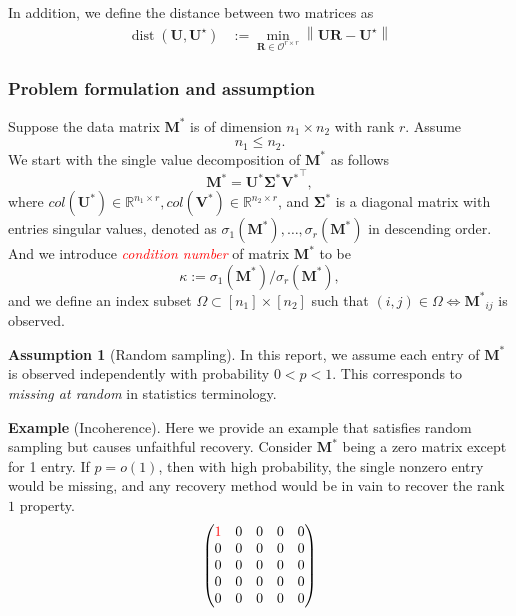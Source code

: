 \documentclass[override]{beamer} %
\theoremstyle{remark}
\newcommand{\bs}[1]{{\boldsymbol{#1}^*}}
\def\red{\textcolor{red}}
\begin{document}
\begin{frame}
In addition, we define the distance between two matrices as 
\begin{equation}
\begin{aligned}
\operatorname{dist}\left(\boldsymbol{U}, \boldsymbol{U}^{\star}\right) &:=\min _{\boldsymbol{R} \in \mathcal{O}^{r \times r}}\left\|\boldsymbol{U} \boldsymbol{R}-\boldsymbol{U}^{\star}\right\| 
\end{aligned}
\end{equation}
\end{frame}



\begin{frame}
\frametitle{Problem formulation and assumption}
Suppose the data matrix $\mathbf M^*$ is of dimension $n_1\times n_2$ with rank $r$.
Assume \[n_1\leq n_2.\]
We start with the single value decomposition of $\bs M$ as follows
\[
\bs M = \bs U \bs \Sigma \bs V^\top,
\]
where $col(\bs U) \in \mathbb R^{n_1\times r}, col(\bs V) \in \mathbb R^{n_2\times r}$, and $\bs \Sigma$ is a diagonal matrix with entries singular values, denoted as $\sigma_1(\bs M), \ldots, \sigma_r(\bs M)$ in descending order.
And we introduce \red{\textit{condition number}} of matrix $\bs M$ to be 
\[
\kappa := \sigma_1(\bs M)/\sigma_r(\bs M),
\]
and we define an index subset $\Omega \subset [n_1]\times [n_2]$ such that $(i,j)\in\Omega \iff \bs M_{ij}$ is observed.

\noindent\textbf{Assumption 1} (Random sampling). 
In this report, we assume each entry of $\bs M$ is observed independently with probability $0<p<1$. 
This corresponds to \textit{missing at random} in statistics terminology.

\noindent\textbf{Example} (Incoherence).
Here we provide an example that satisfies random sampling but causes unfaithful recovery.
Consider $\bs M$ being a zero matrix except for 1 entry. If $p = o(1)$, then with high probability, the single nonzero entry would be missing, and any recovery method would be in vain to recover the rank $1$ property.
$$
\begin{pmatrix}
\red{1}& 0 & 0 & 0 & 0 \\
0 & 0 & 0 & 0 & 0 \\
0 & 0 & 0 & 0 & 0\\
0 & 0 & 0 & 0 & 0\\
0 & 0 & 0 & 0 & 0
\end{pmatrix}
$$


\end{frame}
\end{document}

